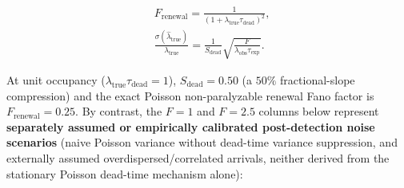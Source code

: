 \documentclass[
  american,
  11pt,
  letterpaper,
]{article}
\begin{document}
\begin{equation}
\begin{aligned}
& F_{\mathrm{renewal}} = \frac{1}{(1 + \lambda_{\mathrm{true}}\tau_{\mathrm{dead}})^2}, \\
& \frac{\sigma(\hat{\lambda}_{\mathrm{true}})}{\lambda_{\mathrm{true}}} = \frac{1}{S_{\mathrm{dead}}}\sqrt{\frac{F}{\lambda_{\mathrm{obs}}\tau_{\mathrm{exp}}}}.
\end{aligned}
\end{equation}

At unit occupancy (\(\lambda_{\mathrm{true}}\tau_{\mathrm{dead}} = 1\)), \(S_{\mathrm{dead}} = 0.50\) (a \(50\%\) fractional-slope compression) and the exact Poisson non-paralyzable renewal Fano factor is \(F_{\mathrm{renewal}} = 0.25\). By contrast, the \(F = 1\) and \(F = 2.5\) columns below represent \textbf{separately assumed or empirically calibrated post-detection noise scenarios} (naive Poisson variance without dead-time variance suppression, and externally assumed overdispersed/correlated arrivals, neither derived from the stationary Poisson dead-time mechanism alone):
\end{document}
